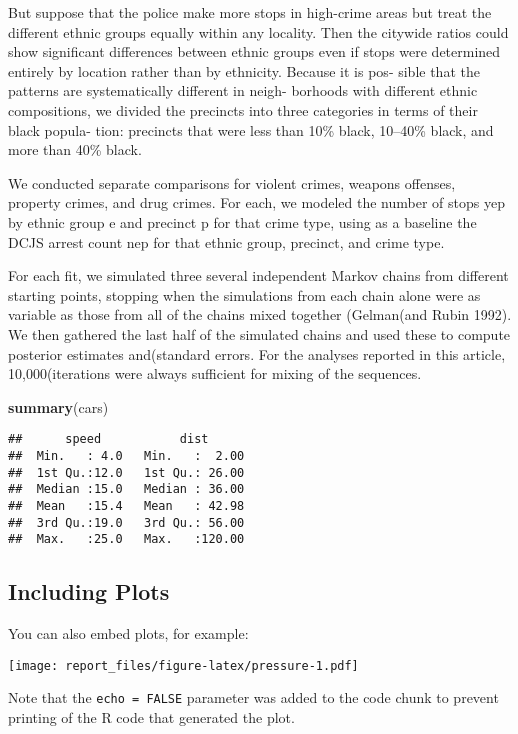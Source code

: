 \documentclass[]{article}
\newenvironment{Shaded}{\begin{snugshade}}{\end{snugshade}}
\newcommand{\KeywordTok}[1]{\textcolor[rgb]{0.13,0.29,0.53}{\textbf{#1}}}
\newcommand{\NormalTok}[1]{#1}
\begin{document}
But suppose that the police make more stops in high-crime areas but
treat the different ethnic groups equally within any locality. Then the
citywide ratios could show significant differences between ethnic groups
even if stops were determined entirely by location rather than by
ethnicity. Because it is pos- sible that the patterns are systematically
different in neigh- borhoods with different ethnic compositions, we
divided the precincts into three categories in terms of their black
popula- tion: precincts that were less than 10\% black, 10--40\% black,
and more than 40\% black.

We conducted separate comparisons for violent crimes, weapons offenses,
property crimes, and drug crimes. For each, we modeled the number of
stops yep by ethnic group e and precinct p for that crime type, using as
a baseline the DCJS arrest count nep for that ethnic group, precinct,
and crime type.

For each fit, we simulated three several independent Markov chains from
different starting points, stopping when the simulations from each chain
alone were as variable as those from all of the chains mixed together
(Gelman(and Rubin 1992). We then gathered the last half of the simulated
chains and used these to compute posterior estimates and(standard
errors. For the analyses reported in this article, 10,000(iterations
were always sufficient for mixing of the sequences.

\begin{Shaded}
\begin{Highlighting}[]
\KeywordTok{summary}\NormalTok{(cars)}
\end{Highlighting}
\end{Shaded}

\begin{verbatim}
##      speed           dist       
##  Min.   : 4.0   Min.   :  2.00  
##  1st Qu.:12.0   1st Qu.: 26.00  
##  Median :15.0   Median : 36.00  
##  Mean   :15.4   Mean   : 42.98  
##  3rd Qu.:19.0   3rd Qu.: 56.00  
##  Max.   :25.0   Max.   :120.00
\end{verbatim}

\hypertarget{including-plots}{%
\subsection{Including Plots}\label{including-plots}}

You can also embed plots, for example:

\texttt{[image: report\_files/figure-latex/pressure-1.pdf]}

Note that the \texttt{echo\ =\ FALSE} parameter was added to the code
chunk to prevent printing of the R code that generated the plot.
\end{document}
